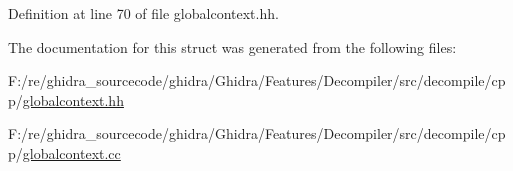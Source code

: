 Definition at line 70 of file globalcontext.\+hh.



The documentation for this struct was generated from the following files\+:\begin{DoxyCompactItemize}
\item 
F\+:/re/ghidra\+\_\+sourcecode/ghidra/\+Ghidra/\+Features/\+Decompiler/src/decompile/cpp/\mbox{\hyperlink{globalcontext_8hh}{globalcontext.\+hh}}\item 
F\+:/re/ghidra\+\_\+sourcecode/ghidra/\+Ghidra/\+Features/\+Decompiler/src/decompile/cpp/\mbox{\hyperlink{globalcontext_8cc}{globalcontext.\+cc}}\end{DoxyCompactItemize}
